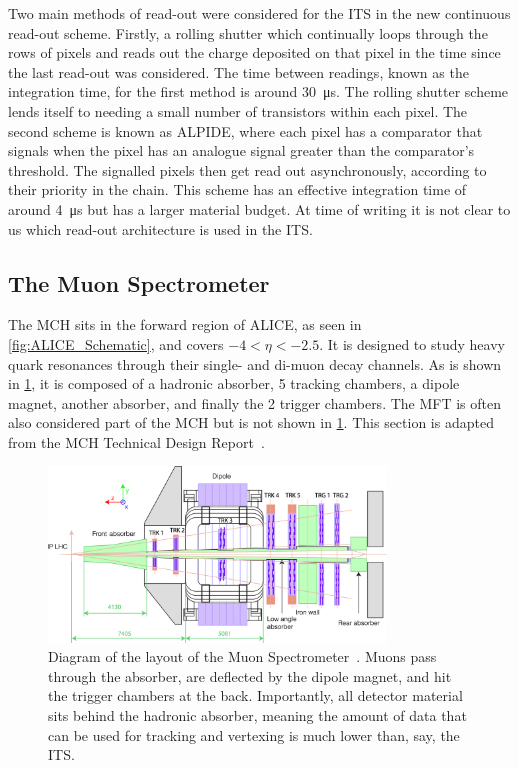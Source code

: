Two main methods of read-out were considered for the ITS in the new continuous read-out scheme. Firstly, a rolling shutter which continually loops through the rows of pixels and reads out the charge deposited on that pixel in the time since the last read-out was considered. The time between readings, known as the integration time, for the first method is around \SI{30}{\micro\second}. The rolling shutter scheme lends itself to needing a small number of transistors within each pixel. The second scheme is known as ALPIDE, where each pixel has a comparator that signals when the pixel has an analogue signal greater than the comparator's threshold. The signalled pixels then get read out asynchronously, according to their priority in the chain. This scheme has an effective integration time of around \SI{4}{\micro\second} but has a larger material budget. At time of writing it is not clear to us which read-out architecture is used in the ITS.

\subsection{The Muon Spectrometer}
The MCH sits in the forward region of ALICE, as seen in \cref{fig:ALICE_Schematic}, and covers $-4<\eta<-2.5$. It is designed to study heavy quark resonances through their single- and di-muon decay channels. As is shown in \cref{fig:Muon Spectrometer}, it is composed of a hadronic absorber, 5 tracking chambers, a dipole magnet, another absorber, and finally the 2 trigger chambers. The MFT is often also considered part of the MCH but is not shown in \cref{fig:Muon Spectrometer}. This section is adapted from the MCH Technical Design Report~\cite{MCH_TDR}.

\begin{figure}[ht]
    \begin{center}
        \includegraphics[width=0.8\textwidth]{Figs/MCH_schematic_pog.png}
        \caption[Diagram of the layout of the Muon Spectrometer]{Diagram of the layout of the Muon Spectrometer~\cite{Muon_Spec_Schematic}. Muons pass through the absorber, are deflected by the dipole magnet, and hit the trigger chambers at the back. Importantly, all detector material sits behind the hadronic absorber, meaning the amount of data that can be used for tracking and vertexing is much lower than, say, the ITS.}
        \label{fig:Muon Spectrometer}
    \end{center}
\end{figure}

